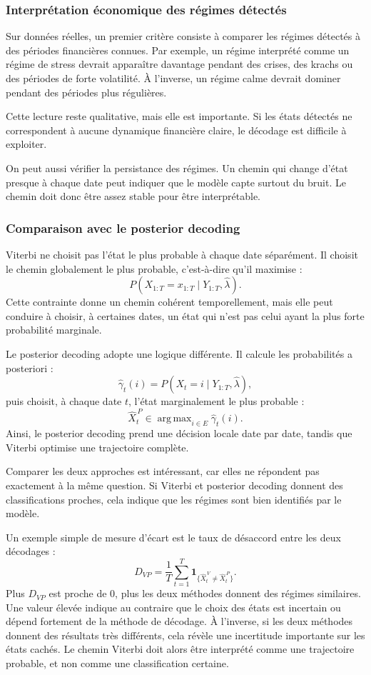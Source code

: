 \documentclass[11pt]{article}
\begin{document}
\subsubsection{Interprétation économique des régimes détectés}

Sur données réelles, un premier critère consiste à comparer les régimes détectés à des périodes financières connues. Par exemple, un régime interprété comme un régime de stress devrait apparaître davantage pendant des crises, des krachs ou des périodes de forte volatilité. À l'inverse, un régime calme devrait dominer pendant des périodes plus régulières.

Cette lecture reste qualitative, mais elle est importante. Si les états détectés ne correspondent à aucune dynamique financière claire, le décodage est difficile à exploiter.

On peut aussi vérifier la persistance des régimes. Un chemin qui change d'état presque à chaque date peut indiquer que le modèle capte surtout du bruit. Le chemin doit donc être assez stable pour être interprétable.

\subsubsection{Comparaison avec le posterior decoding}

Viterbi ne choisit pas l'état le plus probable à chaque date séparément. Il choisit le chemin globalement le plus probable, c'est-à-dire qu'il maximise :
\[
P(X_{1:T}=x_{1:T}\mid Y_{1:T},\widehat{\lambda}).
\]
Cette contrainte donne un chemin cohérent temporellement, mais elle peut conduire à choisir, à certaines dates, un état qui n'est pas celui ayant la plus forte probabilité marginale.

Le posterior decoding adopte une logique différente. Il calcule les probabilités a posteriori :
\[
\widehat{\gamma}_t(i)
=
P(X_t=i\mid Y_{1:T},\widehat{\lambda}),
\]
puis choisit, à chaque date \(t\), l'état marginalement le plus probable :
\[
\widehat{X}_t^{\,P}
\in
\mathop{\mathrm{arg\,max}}_{i\in E}
\widehat{\gamma}_t(i).
\]
Ainsi, le posterior decoding prend une décision locale date par date, tandis que Viterbi optimise une trajectoire complète.

Comparer les deux approches est intéressant, car elles ne répondent pas exactement à la même question. Si Viterbi et posterior decoding donnent des classifications proches, cela indique que les régimes sont bien identifiés par le modèle.

Un exemple simple de mesure d'écart est le taux de désaccord entre les deux décodages :
\[
D_{VP}
=
\frac{1}{T}
\sum_{t=1}^{T}
\mathbf{1}_{\{\widehat{X}_t^{\,V}\neq \widehat{X}_t^{\,P}\}}.
\]
Plus \(D_{VP}\) est proche de \(0\), plus les deux méthodes donnent des régimes similaires. Une valeur élevée indique au contraire que le choix des états est incertain ou dépend fortement de la méthode de décodage. À l'inverse, si les deux méthodes donnent des résultats très différents, cela révèle une incertitude importante sur les états cachés. Le chemin Viterbi doit alors être interprété comme une trajectoire probable, et non comme une classification certaine.
\end{document}
